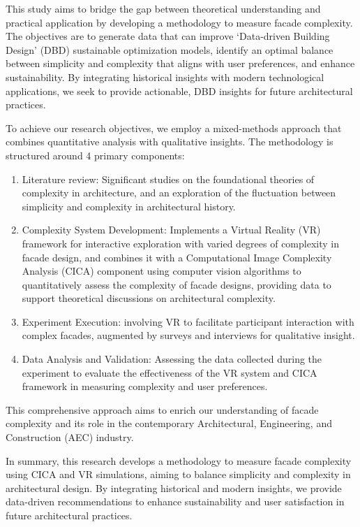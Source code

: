 This study aims to bridge the gap between theoretical understanding and practical application by developing a methodology to measure facade complexity.
The objectives are to generate data that can improve `Data-driven Building Design' (DBD) sustainable optimization models, identify an optimal balance between simplicity and complexity that aligns with user preferences, and enhance sustainability.
By integrating historical insights with modern technological applications, we seek to provide actionable, DBD insights for future architectural practices.

To achieve our research objectives, we employ a mixed-methods approach that combines quantitative analysis with qualitative insights.
The methodology is structured around 4 primary components:

\begin{enumerate}
    \item Literature review: Significant studies on the foundational theories of complexity in architecture, and an exploration of the fluctuation between simplicity and complexity in architectural history.
    \item Complexity System Development: Implements a Virtual Reality (VR) framework for interactive exploration with varied degrees of complexity in facade design, and combines it with a Computational Image Complexity Analysis (CICA) component using computer vision algorithms to quantitatively assess the complexity of facade designs, providing data to support theoretical discussions on architectural complexity.
    \item Experiment Execution: involving VR to facilitate participant interaction with complex facades, augmented by surveys and interviews for qualitative insight.
    \item Data Analysis and Validation: Assessing the data collected during the experiment to evaluate the effectiveness of the VR system and CICA framework in measuring complexity and user preferences.
\end{enumerate}

This comprehensive approach aims to enrich our understanding of facade complexity and its role in the contemporary Architectural, Engineering, and Construction (AEC) industry.

In summary, this research develops a methodology to measure facade complexity using CICA and VR simulations, aiming to balance simplicity and complexity in architectural design.
 By integrating historical and modern insights, we provide data-driven recommendations to enhance sustainability and user satisfaction in future architectural practices.





%
